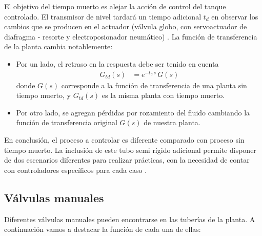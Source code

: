 El objetivo del tiempo muerto es alejar la acción de control del tanque
controlado.
El transmisor de nivel tardará un tiempo adicional $t_d$ en observar los cambios
que se producen en el actuador (válvula globo, con servoactuador de
diafragma - resorte y electroposionador
neumático) \cite{bib:ApuntesPuglesiTema2}.
La función de transferencia de la planta cambia notablemente:
\begin{itemize}
 \item Por un lado, el retraso en la respuesta debe ser tenido en cuenta
 \begin{align}
  G_{td}(s) &= e^{-t_d\,s}\,G(s)
 \end{align}
 donde $G(s)$ corresponde a la función de transferencia de una planta sin
 tiempo muerto, y $G_{td}(s)$ es la misma planta con tiempo muerto.
  \item Por otro lado, se agregan pérdidas por rozamiento del
  fluido cambiando la función de transferencia original $G(s)$ de nuestra
  planta.
\end{itemize}
En conclusión, el proceso a controlar es diferente comparado con proceso sin
tiempo muerto.
La inclusión de este tubo semi rígido adicional permite disponer de dos
escenarios
diferentes para realizar prácticas, con la necesidad de contar con
controladores específicos para cada caso \cite{bib:ApuntesPuglesiTema2}.

\subsection{Válvulas manuales}

Diferentes válvulas manuales pueden encontrarse en las tuberías de la planta.
A continuación vamos a destacar la función de cada una de ellas:

